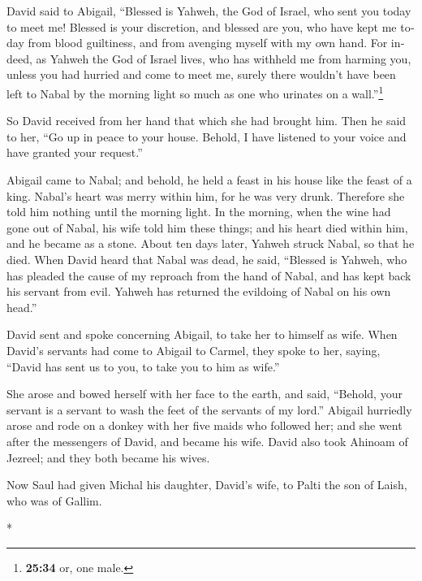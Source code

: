 \begin{paracol}{2}
\begin{otherlanguage}{english}
 David said to Abigail, ``Blessed is Yahweh, the God of
Israel, who sent you today to meet me!  Blessed is your
discretion, and blessed are you, who have kept me today from blood
guiltiness, and from avenging myself with my own hand. 
For indeed, as Yahweh the God of Israel lives, who has withheld me from
harming you, unless you had hurried and come to meet me, surely there
wouldn't have been left to Nabal by the morning light so much as one who
urinates on a wall.''\footnote{\textbf{25:34} or, one male.}

 So David received from her hand that which she had
brought him. Then he said to her, ``Go up in peace to your house.
Behold, I have listened to your voice and have granted your request.''

 Abigail came to Nabal; and behold, he held a feast in
his house like the feast of a king. Nabal's heart was merry within him,
for he was very drunk. Therefore she told him nothing until the morning
light.  In the morning, when the wine had gone out of
Nabal, his wife told him these things; and his heart died within him,
and he became as a stone.  About ten days later, Yahweh
struck Nabal, so that he died.  When David heard that
Nabal was dead, he said, ``Blessed is Yahweh, who has pleaded the cause
of my reproach from the hand of Nabal, and has kept back his servant
from evil. Yahweh has returned the evildoing of Nabal on his own head.''

David sent and spoke concerning Abigail, to take her to himself as wife.
 When David's servants had come to Abigail to Carmel,
they spoke to her, saying, ``David has sent us to you, to take you to
him as wife.''

 She arose and bowed herself with her face to the earth,
and said, ``Behold, your servant is a servant to wash the feet of the
servants of my lord.''  Abigail hurriedly arose and rode
on a donkey with her five maids who followed her; and she went after the
messengers of David, and became his wife.  David also
took Ahinoam of Jezreel; and they both became his wives.

 Now Saul had given Michal his daughter, David's wife, to
Palti the son of Laish, who was of Gallim.

\end{otherlanguage}

\switchcolumn[0]*


\end{paracol}
